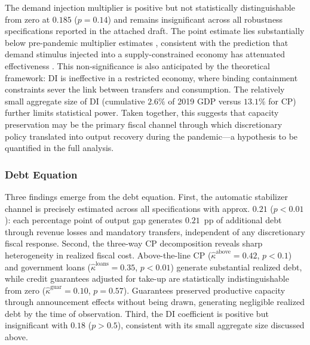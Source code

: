 \documentclass[12pt, a4paper]{article}
\begin{document}
The demand injection multiplier is positive but not statistically distinguishable from zero at $0.185$ ($p = 0.14$) and remains insignificant across all robustness specifications reported in the attached draft. The point estimate lies substantially below pre-pandemic multiplier estimates \citep{blanchard2002, ramey2018}, consistent with the prediction that demand stimulus injected into a supply-constrained economy has attenuated effectiveness \citep{chetty2020, guerrieri2022}. This non-significance is also anticipated by the theoretical framework: DI is ineffective in a restricted economy, where binding containment constraints sever the link between transfers and consumption. The relatively small aggregate size of DI (cumulative $2.6\%$ of 2019 GDP versus $13.1\%$ for CP) further limits statistical power. Taken together, this suggests that capacity preservation may be the primary fiscal channel through which discretionary policy translated into output recovery during the pandemic---a hypothesis to be quantified in the full analysis.


\subsubsection{Debt Equation}

Three findings emerge from the debt equation. First, the automatic stabilizer channel is precisely estimated across all specifications with approx. $0.21$ ($p < 0.01$): each percentage point of output gap generates $0.21$~pp of additional debt through revenue losses and mandatory transfers, independent of any discretionary fiscal response.
Second, the three-way CP decomposition reveals sharp heterogeneity in realized fiscal cost. Above-the-line CP ($\hat{\kappa}^{\text{above}} = 0.42$, $p < 0.1$) and government loans ($\hat{\kappa}^{\text{loans}} = 0.35$, $p < 0.01$) generate substantial realized debt, while credit guarantees adjusted for take-up are statistically indistinguishable from zero ($\hat{\kappa}^{\text{guar}} = 0.10$, $p = 0.57$). Guarantees preserved productive capacity through announcement effects without being drawn, generating negligible realized debt by the time of observation. Third, the DI coefficient is positive but insignificant with $0.18$ ($p > 0.5$), consistent with its small aggregate size discussed above.
\end{document}
